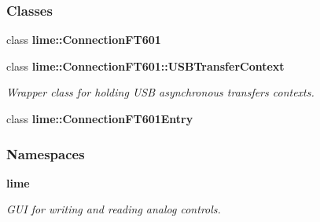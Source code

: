 \subsubsection*{Classes}
\begin{DoxyCompactItemize}
\item 
class {\bf lime\+::\+Connection\+F\+T601}
\item 
class {\bf lime\+::\+Connection\+F\+T601\+::\+U\+S\+B\+Transfer\+Context}
\begin{DoxyCompactList}\small\item\em Wrapper class for holding U\+SB asynchronous transfers contexts. \end{DoxyCompactList}\item 
class {\bf lime\+::\+Connection\+F\+T601\+Entry}
\end{DoxyCompactItemize}
\subsubsection*{Namespaces}
\begin{DoxyCompactItemize}
\item 
 {\bf lime}
\begin{DoxyCompactList}\small\item\em G\+UI for writing and reading analog controls. \end{DoxyCompactList}\end{DoxyCompactItemize}
